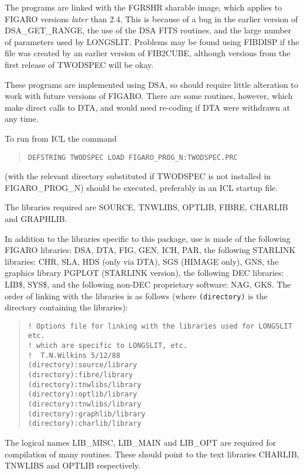 The programs are linked with the FGRSHR sharable image, which applies
to FIGARO versions {\em later} than 2.4. This is because of a bug in
the earlier version of DSA\_GET\_RANGE, the use of the DSA FITS
routines, and the large number of parameters used by LONGSLIT.
Problems may be found using FIBDISP if the file was created by an
earlier version of FIB2CUBE, although versions from the first release of
TWODSPEC will be okay.

These programs are implemented using DSA, so should require little
alteration to work with future versions of FIGARO. There are some
routines, however, which make direct calls to DTA, and would need
re-coding if DTA were withdrawn at any time.

To run from ICL the command
\begin{quote}\begin{verbatim}
DEFSTRING TWODSPEC LOAD FIGARO_PROG_N:TWODSPEC.PRC
\end{verbatim}\end{quote}
(with the relevant directory substituted if TWODSPEC is not installed in
FIGARO\_PROG\_N) should be executed, preferably in an ICL startup file.

The libraries required are SOURCE, TNWLIBS, OPTLIB, FIBRE, CHARLIB and
GRAPHLIB.

In addition to the libraries specific to this package, use is made of
the following FIGARO libraries: DSA, DTA, FIG, GEN, ICH, PAR, the
following STARLINK libraries: CHR, SLA, HDS (only via DTA), SGS (HIMAGE
only), GNS, the graphics library PGPLOT (STARLINK version), the
following DEC libraries: LIB\$, SYS\$, and the following non-DEC
proprietary software: NAG, GKS.
The order of linking with the libraries is as follows (where
{\tt (directory)} is the directory containing the libraries):

\begin{quote}\begin{verbatim}
! Options file for linking with the libraries used for LONGSLIT etc.
! which are specific to LONGSLIT, etc.
!  T.N.Wilkins 5/12/88
(directory):source/library
(directory):fibre/library
(directory):tnwlibs/library
(directory):optlib/library
(directory):tnwlibs/library
(directory):graphlib/library
(directory):charlib/library
\end{verbatim}\end{quote}
The logical names LIB\_MISC, LIB\_MAIN and LIB\_OPT are required for
compilation of many routines. These should point to the text libraries
CHARLIB, TNWLIBS and OPTLIB respectively.

